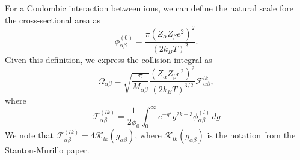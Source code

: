 \documentclass[a4paper,11pt]{report}
\begin{document}
For a Coulombic interaction between ions, we can define the natural scale fore the cross-sectional area as
\begin{equation}
    \phi^{(0)}_{\alpha \beta} = \frac{ \pi \left (Z_\alpha Z_\beta e^2 \right)^2}{ \left(2 k_B T\right)^2}.
\end{equation}
Given this definition, we express the collision integral as
\begin{equation}
    \Omega_{\alpha \beta} = \sqrt{ \frac{\pi }{M_{\alpha \beta}}} \frac{( Z_\alpha Z_\beta e^2)^2 }{(2 k_B T )^{3/2}} \mathcal{F}^{lk}_{\alpha \beta},
\end{equation}
where
\begin{equation}
    \mathcal{F}^{(lk)}_{\alpha \beta} = \frac{1}{2 \phi_0} \int_0^\infty e^{-g^2} g^{2k+3} \phi_{\alpha \beta}^{(l)} \, dg
\end{equation}
We note that $\mathcal{F}^{(lk)}_{\alpha \beta} = 4 \mathcal{K}_{lk}(g_{\alpha \beta})$, where $\mathcal{K}_{lk}(g_{\alpha \beta})$ is the notation from the Stanton-Murillo paper.
\end{document}
